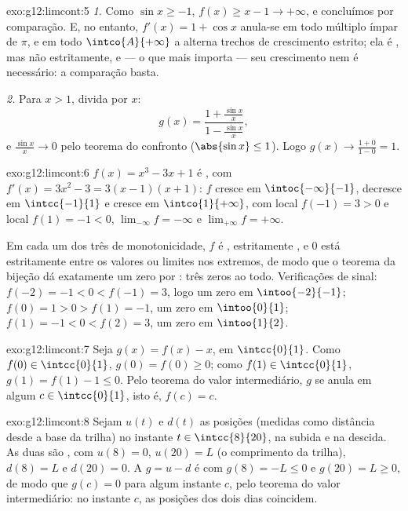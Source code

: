 \begin{solution}{exo:g12:limcont:5}
\emph{1.} Como $\sin x \geq -1$, $f(x) \geq x - 1 \to +\infty$, e
concluímos por comparação. E, no entanto, $f'(x) = 1 + \cos x$ anula-se em
todo múltiplo ímpar de $\pi$, e em todo  $\intco{A}{+\infty}$ a
 alterna trechos de crescimento estrito; ela é , mas não
estritamente, e --- o que mais importa --- seu crescimento nem é
necessário: a comparação basta.

\emph{2.} Para $x > 1$, divida por $x$:
\[
g(x) = \frac{1 + \frac{\sin x}{x}}{1 - \frac{\sin x}{x}},
\]
e $\frac{\sin x}{x} \to 0$ pelo teorema do confronto
($\abs{\sin x} \leq 1$). Logo $g(x) \to \frac{1+0}{1-0} = 1$.
\end{solution}

\begin{solution}{exo:g12:limcont:6}
$f(x) = x^3 - 3x + 1$ é , com
$f'(x) = 3x^2 - 3 = 3(x-1)(x+1)$: $f$ cresce em $\intoc{-\infty}{-1}$,
decresce em $\intcc{-1}{1}$ e cresce em $\intco{1}{+\infty}$, com 
local $f(-1) = 3 > 0$ e  local $f(1) = -1 < 0$,
$\lim_{-\infty} f = -\infty$ e $\lim_{+\infty} f = +\infty$.

Em cada um dos três  de monotonicidade, $f$ é ,
estritamente , e $0$ está estritamente entre os valores ou
limites nos extremos, de modo que o teorema da bijeção dá exatamente um
zero por : três zeros ao todo. Verificações de sinal:
$f(-2) = -1 < 0 < f(-1) = 3$, logo um zero em $\intoo{-2}{-1}$;
$f(0) = 1 > 0 > f(1) = -1$, um zero em $\intoo{0}{1}$;
$f(1) = -1 < 0 < f(2) = 3$, um zero em $\intoo{1}{2}$.
\end{solution}

\begin{solution}{exo:g12:limcont:7}
Seja $g(x) = f(x) - x$,  em $\intcc{0}{1}$. Como
$f(0) \in \intcc{0}{1}$, $g(0) = f(0) \geq 0$; como
$f(1) \in \intcc{0}{1}$, $g(1) = f(1) - 1 \leq 0$. Pelo teorema do valor
intermediário, $g$ se anula em algum $c \in \intcc{0}{1}$, isto é,
$f(c) = c$.
\end{solution}

\begin{solution}{exo:g12:limcont:8}
Sejam $u(t)$ e $d(t)$ as posições (medidas como distância desde a base da
trilha) no instante $t \in \intcc{8}{20}$, na subida e na descida. As duas
são , com $u(8) = 0$, $u(20) = L$ (o comprimento da trilha),
$d(8) = L$ e $d(20) = 0$. A  $g = u - d$ é  com
$g(8) = -L \leq 0$ e $g(20) = L \geq 0$, de modo que $g(c) = 0$ para algum
instante $c$, pelo teorema do valor intermediário: no instante $c$, as
posições dos dois dias coincidem.
\end{solution}

